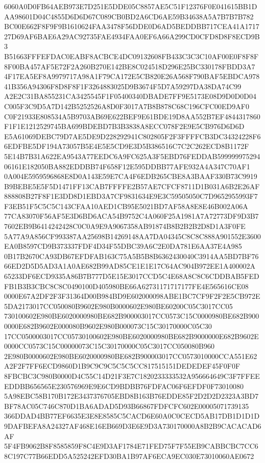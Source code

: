 \documentclass[UTF8,fontset=fandol,zihao=-4,a4paper]{ctexart}
\begin{document}
{{6060A0D0FB64AEB973E7D251E5DDE05C8857AE5C51F12376F0E041615BB1DAA98601D04C4855D6D6D67C089CB0BD2A6CD6AE59B34638A5A7B7B7B782
BC00E662F8F9F9B1610624FAA3478F56DDE0D6AD5BEDDBB717CEA41A171727D69AF6BAE6A29AC92735FAE4934FAA0EF6A66A299CD0CFD8D8F8ECD9B3
B51663FFFEFDAC0EABF8ACBCE4DC09132608FB433C3C3C10AF00E0F8F8F8F00BA457AF5E72F2A260B270E142BE8C024518D296E25BC330178FBDD3A7
4F17EA5EF8A9979717A98A1F79CA172E5CB820E26A568F790BAF5EBDCA97841B356A94306F8D8F8F1F3264883025D9B3674F5D7A59297DA38DA74C99
A2E2C31BA855231CA3425545F1F05400340DBADE7FF9E5173E08D9D0D0D04C005F3C9D5A7D142B5252526A8D0F3017A7B8B878C68C196CFC00ED9AF0
C0F21933E808534A5B9703AB69E622BEF9E61BDE19D8AA552B7EF4844317860F1F1E1212529745BA699BDEBD7B3B3838A8ECC078F2E9E5CB976D6D6D
E5A61069DEBC79D7AE5DE9D228292941C802805F2F3FFFFCB3DC34324228F66EDFBE5DF194A73057B5E4E5E5CD9E3D5B386516C7C2C262ECD8B1172F
5E14B7B31A622EA9543A77EEDC6A9FC625A3F5EBD76FEDDAB59999997529406161E182050BA882EDDBB74F658F12E595DDBB77AFE932A4A347C70AF1
0A004E5959596868E8D0A143E59E7CA4F6EDB265CBE8A3BAAF330B73C9919B9BEBE5E5F5D1471FF13CAB7FFFFE2B57AE7CFCF8711D1B031A6B2E26AF
888808B27F8F1E3DD8D1EBD3A7CF9831634E9E3C59505050C7D9652955993F7F3EB51F5C5C5C143CFAA10AED1CB95E5021BD7AF58A8E8E46B002A06A
77CA83070F56AF5E3D6BD6ACA54B9752C4A060F25A1981A7A72773DF9D3B77602EB9B6414242428C0C0A9E9A9067358AB91874B8B2B2B2D8D1A3F0FE
5A77A9A856CF993387AA25698B14269148AA7DA04345C8C8C888A901552E3600EA0B8597CD9B373337FDF4D34F55DBC39A6C2E0DA781E6AA37E4A985
0B17B2670CA93DB67EFDFAB163C75A5B5B8B6362430040C3914AA5BD7BF7666ED2D5D5AD3A1A0AE682B99AD85CE1E1E17C64AC904B972EE1A400002A
65233DF6ECD9335A86B7B777D5E15E3017CCD5C4E68A8C8C6CDDBAB5FEDFB1B3B3CBC8C8C0490100D405980BE66A62731171717177FE4E565616CE08
0000E67A2DF2F3F31364D00B984BD9E602000098ABE1BC7CF9F2F2E5CB972E5DA2173017CC050080B9602E980B0000602E980BE60200C05C3017CC05
730100602E980BE6020000980BE682B900003017CC0573C15C0000980BE682B9000000E682B9602E000080B9602E980B000073C15C30170000C05C30
17CC0500003017CC05730100602E980BE6020000980BE682B9000000E682B9602E0000CC0573C15C00000073C15C30170000C05C3017CC050080B960
2E980B0000602E980BE6020000980BE682B900003017CC0573010000CCA551E62A2F2F7FF6ECD9860D1B9C9C9C5C5C5CC817515151DEDEDEF45F0F0F
8FBCBC3C980B0000D4C55C14D21F3E7C1820233333532A956664649C3F7FFEEEDDBB656565E230576969E9E6CD9BDBB76FDFAC06F6EFDF0F73010080
5A98EBC58B170B172E3437376705EBD8B163B76EDDE85F2D2D2D2323A3BD7BF78AC05C746C870D1BA6ADAD5D93B66867FDFCFC602E00005071739135
366DDAD4BB77EF6635E3E8E8585C5CACD6E60A0C0CECD5AB17DB1D1D1D9DAFBEFA8A24327AF468E16EB669D3E6E9D3A730170000A8B2B9CACACAD6AF
5F4FB9062B8F8585859F8C4E9D3AF1784E71FED75F7F55EB9CABBCBC7CC68C197C77B66EDD5A525242EFD30BA1B97AF6ECA9EC030E73010060AE0672
}}
\end{document}
